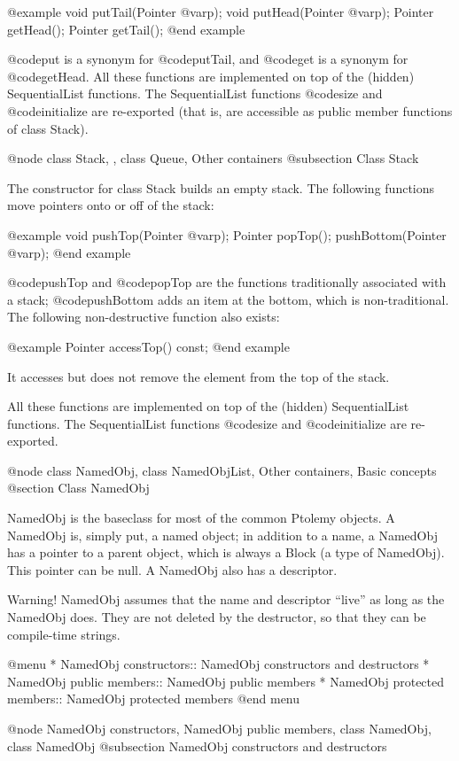 @example
void putTail(Pointer @var{p});
void putHead(Pointer @var{p});
Pointer getHead();
Pointer getTail();
@end example

@code{put} is a synonym for @code{putTail}, and @code{get} is a synonym
for @code{getHead}.  All these functions are implemented on top of the
(hidden) SequentialList functions.  The SequentialList functions
@code{size} and @code{initialize} are re-exported (that is, are
accessible as public member functions of class Stack).

@node class Stack,  , class Queue, Other containers
@subsection Class Stack

The constructor for class Stack builds an empty stack.  The following
functions move pointers onto or off of the stack:

@example
void pushTop(Pointer @var{p});
Pointer popTop();
pushBottom(Pointer @var{p});
@end example

@code{pushTop} and @code{popTop} are the functions traditionally
associated with a stack; @code{pushBottom} adds an item at the bottom,
which is non-traditional.  The following non-destructive function
also exists:

@example
Pointer accessTop() const;
@end example

It accesses but does not remove the element from the top of the stack.

All these functions are implemented on top of the (hidden)
SequentialList functions.  The SequentialList functions @code{size} and
@code{initialize} are re-exported.

@node class NamedObj, class NamedObjList, Other containers, Basic concepts
@section Class NamedObj

NamedObj is the baseclass for most of the common Ptolemy objects.  A
NamedObj is, simply put, a named object; in addition to a name, a
NamedObj has a pointer to a parent object, which is always a Block (a
type of NamedObj).  This pointer can be null.  A NamedObj also has a
descriptor.

Warning!  NamedObj assumes that the name and descriptor ``live'' as long
as the NamedObj does.  They are not deleted by the destructor, so
that they can be compile-time strings.

@menu
* NamedObj constructors::       NamedObj constructors and destructors
* NamedObj public members::     NamedObj public members
* NamedObj protected members::  NamedObj protected members
@end menu

@node NamedObj constructors, NamedObj public members, class NamedObj, class NamedObj
@subsection NamedObj constructors and destructors

